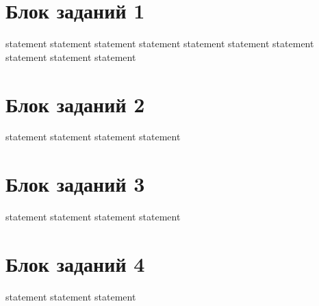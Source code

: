 \section{Блок заданий 1}

{statement}
{statement}
{statement}
{statement}
{statement}
{statement}
{statement}
{statement}
{statement}
{statement}

\section{Блок заданий 2}

{statement}
{statement}
{statement}
{statement}

\section{Блок заданий 3}

{statement}
{statement}
{statement}
{statement}

\section{Блок заданий 4}

{statement}
{statement}
{statement}